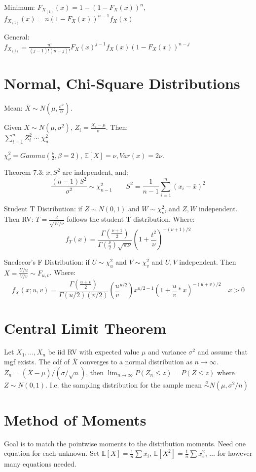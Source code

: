 \documentclass[10pt]{article}
\begin{document}
Minimum:
$F_{X_{(1)}}(x) = 1 - (1 - F_X(x))^n$, \\
$f_{X_{(1)}}(x) = n (1 - F_X(x)) ^ {n-1} f_X(x)$

General:\\
$f_{X_{(j)}} = \frac{n!}{(j-1)!(n-j)!}F_X(x)^{j-1}f_X(x)(1-F_X(x))^{n-j}$


\section{Normal, Chi-Square Distributions}
Mean: $\bar{X} \sim N(\mu, \frac{\sigma^2}{n})$.

Given $X \sim N(\mu, \sigma^2)$, $Z_i = \frac{X_i - \mu}{\sigma}$. Then:\\
$\sum_{i=1}^n Z_i^2 \sim \chi^2_n$

$\chi^2_\nu = Gamma(\frac{\nu}{2}, \beta=2)$, $\mathbb{E}[X] = \nu, Var(x) = 2\nu$.

Theorem 7.3: $\bar{x}, S^2$ are independent, and:
$$\frac{(n - 1)S^2}{\sigma^2} \sim \chi^2_{n-1} \quad \quad S^2 = \frac{1}{n-1} \sum_{i=1}^n (x_i - \bar{x})^2$$

Student T Distribution: if $Z \sim N(0, 1)$ and $W \sim \chi^2_\nu$, and $Z, W$ independent. Then RV:
$T = \frac{Z}{\sqrt{W / \nu}}$ follows the student T distribution. Where:\\
$$f_T(x) = \frac{\Gamma(\frac{\nu + 1}{2})}{\Gamma(\frac{\nu}{2}) \sqrt{\pi \nu}}(1 + \frac{t^2}{\nu})^{-(\nu + 1)/2}$$


Snedecor's F Distribution: if $U \sim \chi^2 _u$ and $V \sim \chi^2 _v$ and $U,V$ independent.
Then $X = \frac{U / u}{V / v} \sim F_{u,v}$. Where:
$$f_X(x; u, v) = \frac{\Gamma(\frac{u + v}{2})}{\Gamma(u/2)(v/2)} (\frac{u}{v}^{u/2}) x^{u/2 - 1} (1 + \frac{u}{v} * x)^{-(u + v)/2} \quad x > 0$$

\section{Central Limit Theorem}
Let $X_1, \dots, X_n$ be iid RV with expected value $\mu$ and variance $\sigma^2$ and assume that mgf exists.
The cdf of $\bar{X}$ converges to a normal distribution as $n \to \infty$. 
$Z_n = (\bar{X} - \mu)/(\sigma / \sqrt{n})$, then $\lim_{n \to \infty} P(Z_n \leq z) = P(Z \leq z)$ where $Z \sim N(0,1)$.
I.e. the sampling distribution for the sample mean $\overset{a}{\sim} N(\mu, \sigma^2/n)$

\section{Method of Moments}
Goal is to match the pointwise moments to the distribution moments.
Need one equation for each unknown.
Set $\mathbb{E}[X] = \frac{1}{n} \sum x_i$, $\mathbb{E}[X^2] = \frac{1}{n} \sum x_i ^2$, $\dots$ for however many equations needed.
\end{document}
